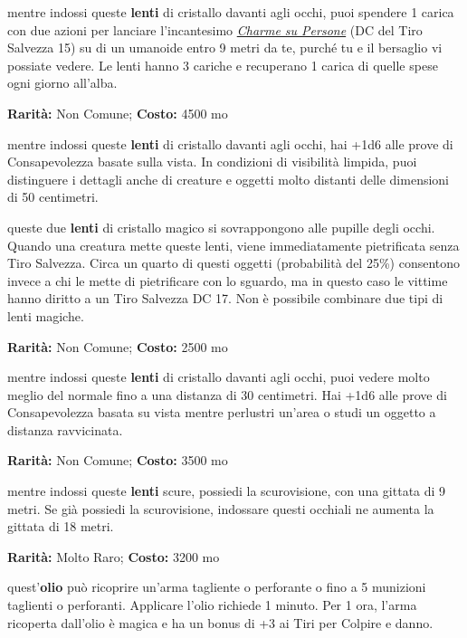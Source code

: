 \begin{multicols}{2}
mentre indossi queste \textbf{lenti} di cristallo davanti agli occhi, puoi spendere 1 carica con due azioni per lanciare l'incantesimo \emph{\hyperlink{Charme su Persone}{Charme su Persone}} (DC del Tiro Salvezza 15) su di un umanoide entro 9 metri da te, purché tu e il bersaglio vi possiate vedere. Le lenti hanno 3 cariche e recuperano 1 carica di quelle spese ogni giorno all'alba.


\textbf{Rarità:} Non Comune; \textbf{Costo:} 4500 mo

mentre indossi queste \textbf{lenti} di cristallo davanti agli occhi, hai +1d6 alle prove di Consapevolezza basate sulla vista. In condizioni di visibilità limpida, puoi distinguere i dettagli anche di creature e oggetti molto distanti delle dimensioni di 50 centimetri.


queste due \textbf{lenti} di cristallo magico si sovrappongono alle pupille degli occhi. Quando una creatura mette queste lenti, viene immediatamente pietrificata senza Tiro Salvezza. Circa un quarto di questi oggetti (probabilità del 25\%) consentono invece a chi le mette di pietrificare con lo sguardo, ma in questo caso le vittime hanno diritto a un Tiro Salvezza DC 17. Non è possibile combinare due tipi di lenti magiche.


\textbf{Rarità:} Non Comune; \textbf{Costo:} 2500 mo

mentre indossi queste \textbf{lenti} di cristallo davanti agli occhi, puoi vedere molto meglio del normale fino a una distanza di 30 centimetri. Hai +1d6 alle prove di Consapevolezza basata su vista mentre perlustri un'area o studi un oggetto a distanza ravvicinata.


\textbf{Rarità:} Non Comune; \textbf{Costo:} 3500 mo

mentre indossi queste \textbf{lenti} scure, possiedi la scurovisione, con una gittata di 9 metri. Se già possiedi la scurovisione, indossare questi occhiali ne aumenta la gittata di 18 metri.


\textbf{Rarità:} Molto Raro; \textbf{Costo:} 3200 mo

quest'\textbf{olio} può ricoprire un'arma tagliente o perforante o fino a 5 munizioni taglienti o perforanti. Applicare l'olio richiede 1 minuto. Per 1 ora, l'arma ricoperta dall'olio è magica e ha un bonus di +3 ai Tiri per Colpire e danno.


\end{multicols}
